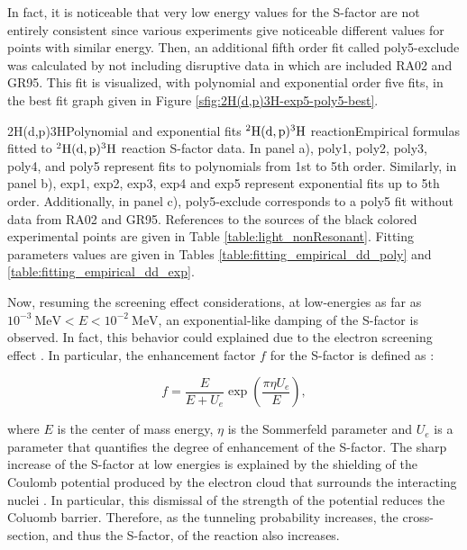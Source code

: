 \documentclass[openany]{book}
\begin{document}
 In fact, it is noticeable that very low energy values for the S-factor are not entirely consistent since various experiments give noticeable different values for points with similar energy. Then, an additional fifth order fit called poly5-exclude was calculated by not including disruptive data in which are included RA02 and GR95. This fit is visualized, with polynomial and exponential order five fits, in the best fit graph given in Figure \ref{sfig:2H(d,p)3H-exp5-poly5-best}.

{2H(d,p)3H}{Polynomial and exponential fits $\mathrm{{}^{2}H(d, p){}^{3}H}$ reaction}{Empirical formulas fitted to $\mathrm{{}^{2}H(d, p){}^{3}H}$ reaction S-factor data. In panel a), poly1, poly2, poly3, poly4, and poly5 represent fits to polynomials from 1st to 5th order.  Similarly, in panel b), exp1, exp2, exp3, exp4 and exp5 represent exponential fits up to 5th order. Additionally, in panel c), poly5-exclude corresponds to a poly5 fit without data from RA02 and GR95. References to the sources of the black colored experimental points are given in Table \ref{table:light_nonResonant}. Fitting parameters values are given in Tables \ref{table:fitting_empirical_dd_poly} and \ref{table:fitting_empirical_dd_exp}.}



Now, resuming the screening effect considerations, at low-energies as far as $ \mathrm{10^{-3} \ MeV}  <  E<\mathrm{10^{-2} \ MeV}$, an exponential-like damping of the S-factor is observed. In fact, this  behavior could explained due to the electron screening effect \cite{raiola_migliardi_gyurky_aliotta_formicola_bonetti_broggini_campajola_corvisiero_costantini_et_2002}. In particular, the enhancement factor $f$ for the S-factor is defined as \cite{assenbaum_langanke_rolfs_1987}: 

\begin{equation}\label{eq:screening_factor}
	f = \frac{E}{E + U_e}\exp{\left(\frac{\pi \eta U_e}{E}\right)},
\end{equation}

where $E$ is the center of mass energy, $\eta$ is the Sommerfeld parameter and $U_e$ is a parameter that quantifies the degree of enhancement of the S-factor. The sharp increase of the S-factor at low energies is explained by the shielding of the Coulomb potential produced by the electron cloud that surrounds the interacting nuclei \cite{assenbaum_langanke_rolfs_1987}. In particular, this dismissal of the strength of the potential reduces the Coluomb barrier. Therefore, as the tunneling probability increases, the cross-section, and thus the S-factor, of the reaction also increases. \\
\end{document}
